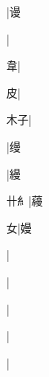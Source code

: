 \begin{multicols}{2}
{{}|{\cjk{}谩}\par
{}|{}\par
{\cjk{}{\cnsym{}　}{\cnsym{}　}韋}|{}\par
{\cjk{}{\cnsym{}　}{\cnsym{}　}皮}|{}\par
{\cjk{}{\cnsym{}　}木子}|{}\par
{}|{\cjk{}缦}\par
{}|{\cjk{}縵}\par
{\cjk{}{\cnsym{}　}卄{糹}}|{\cjk{}蘰}\par
{\cjk{}{\cnsym{}　}{\cnsym{}　}女}|{\cjk{}嫚}\par
{\cjk{}{\cnsym{}　}{\cnsym{}　}{\cnsym{}　}}|{}\par
{\cjk{}{\cnsym{}　}{\cnsym{}　}{\cnsym{}　}}|{}\par
{\cjk{}{\cnsym{}　}{\cnsym{}　}{\cnsym{}　}}|{}\par
{\cjk{}{\cnsym{}　}{\cnsym{}　}{\cnsym{}　}}|{}\par
{\cjk{}{\cnsym{}　}{\cnsym{}　}{\cnsym{}　}}|{}\par
}
\end{multicols}
